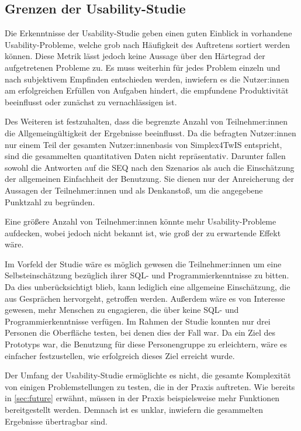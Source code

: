 \subsection{Grenzen der Usability-Studie}
Die Erkenntnisse der Usability-Studie geben einen guten Einblick in vorhandene Usability-Probleme, welche grob nach Häufigkeit des Auftretens sortiert werden können. Diese Metrik lässt jedoch keine Aussage über den Härtegrad der aufgetretenen Probleme zu. Es muss weiterhin für jedes Problem einzeln und nach subjektivem Empfinden entschieden werden, inwiefern es die Nutzer:innen am erfolgreichen Erfüllen von Aufgaben hindert, die empfundene Produktivität beeinflusst oder zunächst zu vernachlässigen ist.

\pskip
Des Weiteren ist festzuhalten, dass die begrenzte Anzahl von Teilnehmer:innen die All­ge­mein­gül­tig­keit der Ergebnisse beeinflusst. Da die befragten Nutzer:innen nur einem Teil der gesamten Nutzer:innenbasis von Simplex4TwIS entspricht, sind die gesammelten quantitativen Daten nicht repräsentativ. Darunter fallen sowohl die Antworten auf die \ac{SEQ} nach den Szenarios als auch die Einschätzung der allgemeinen Einfachheit der Benutzung. Sie dienen nur der Anreicherung der Aussagen der Teilnehmer:innen und als Denkanstoß, um die angegebene Punktzahl zu begründen.

Eine größere Anzahl von Teilnehmer:innen könnte mehr Usability-Probleme aufdecken, wobei jedoch nicht bekannt ist, wie groß der zu erwartende Effekt wäre.

\pskip
Im Vorfeld der Studie wäre es möglich gewesen die Teilnehmer:innen um eine Selbsteinschätzung bezüglich ihrer \ac{SQL}- und Programmierkenntnisse zu bitten. Da dies unberücksichtigt blieb, kann lediglich eine allgemeine Einschätzung, die aus Gesprächen hervorgeht, getroffen werden. Außerdem wäre es von Interesse gewesen, mehr Menschen zu engagieren, die über keine \ac{SQL}- und Programmierkenntnisse verfügen. Im Rahmen der Studie konnten nur drei Personen die Oberfläche testen, bei denen dies der Fall war. Da ein Ziel des Prototyps war, die Benutzung für diese Personengruppe zu erleichtern, wäre es einfacher festzustellen, wie erfolgreich dieses Ziel erreicht wurde.

\pskip
Der Umfang der Usability-Studie ermöglichte es nicht, die gesamte Komplexität von einigen Problemstellungen zu testen, die in der Praxis auftreten. Wie bereits in \ref{sec:future} erwähnt, müssen in der Praxis beispielsweise mehr Funktionen bereitgestellt werden. Demnach ist es unklar, inwiefern die gesammelten Ergebnisse übertragbar sind.
